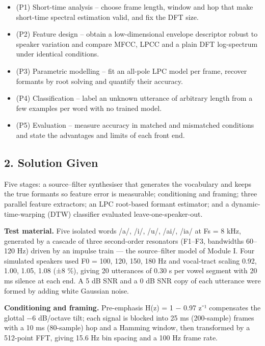 \documentclass[
]{article}
\begin{document}
\begin{itemize}
\item
  (P1) Short-time analysis -- choose frame length, window and hop that
  make short-time spectral estimation valid, and fix the DFT size.
\item
  (P2) Feature design -- obtain a low-dimensional envelope descriptor
  robust to speaker variation and compare MFCC, LPCC and a plain DFT
  log-spectrum under identical conditions.
\item
  (P3) Parametric modelling -- fit an all-pole LPC model per frame,
  recover formants by root solving and quantify their accuracy.
\item
  (P4) Classification -- label an unknown utterance of arbitrary length
  from a few examples per word with no trained model.
\item
  (P5) Evaluation -- measure accuracy in matched and mismatched
  conditions and state the advantages and limits of each front end.
\end{itemize}

\subsection{2. Solution Given}\label{2-solution-given}

Five stages: a source--filter synthesiser that generates the vocabulary
and keeps the true formants so feature error is measurable; conditioning
and framing; three parallel feature extractors; an LPC root-based
formant estimator; and a dynamic-time-warping (DTW) classifier evaluated
leave-one-speaker-out.

\textbf{Test material.} Five isolated words /a/, /i/, /u/, /ai/, /ia/ at
Fs = 8 kHz, generated by a cascade of three second-order resonators
(F1--F3, bandwidths 60--120 Hz) driven by an impulse train --- the
source--filter model of Module I. Four simulated speakers used F0 = 100,
120, 150, 180 Hz and vocal-tract scaling 0.92, 1.00, 1.05, 1.08 (±8 \%),
giving 20 utterances of 0.30 s per vowel segment with 20 ms silence at
each end. A 5 dB SNR and a 0 dB SNR copy of each utterance were formed
by adding white Gaussian noise.

\textbf{Conditioning and framing.} Pre-emphasis H(z) = 1 − 0.97 z⁻¹
compensates the glottal −6 dB/octave tilt; each signal is blocked into
25 ms (200-sample) frames with a 10 ms (80-sample) hop and a Hamming
window, then transformed by a 512-point FFT, giving 15.6 Hz bin spacing
and a 100 Hz frame rate.
\end{document}

